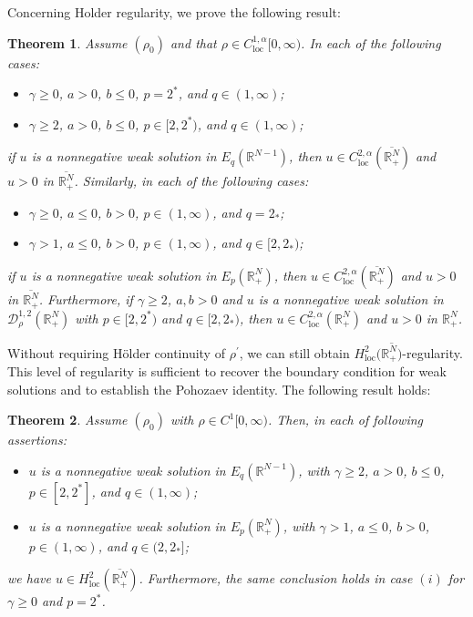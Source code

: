 \documentclass[12pt,reqno]{amsart}
\newtheorem{theorem}{Theorem}[section]
\begin{document}
\bigskip


Concerning Holder regularity, we prove the following result:

\begin{theorem}\label{Holder regularity result}
Assume $(\rho_0)$ and that $\rho\in C^{1,\alpha}_{\mathrm{loc}}[0,\infty)$. In each of the following cases:
\begin{itemize}
    \item[$(i)$] $\gamma \geq 0$, $a > 0$, $b \leq 0$, $p = 2^\ast$, and $q \in (1,\infty)$;
    \item[$(ii)$] $\gamma \geq 2$, $a > 0$, $b \leq 0$, $p \in [2, 2^\ast)$, and $q \in (1,\infty)$;
\end{itemize}
if $u$ is a nonnegative weak solution in $E_q(\mathds{R}^{N-1})$, then \( u \in C^{2,\alpha}_{\mathrm{loc}}(\overline{\mathds{R}^N_+}) \) and \( u > 0 \) in \( \overline{\mathds{R}^N_+} \). Similarly, in each of the following cases:
\begin{itemize}
    \item[$(iii)$] $\gamma \geq 0$, $a \leq 0$, $b > 0$, $p \in (1,\infty)$, and $q = 2_\ast$;
    \item[$(iv)$] $\gamma > 1$, $a \leq 0$, $b > 0$, $p \in (1,\infty)$, and $q \in [2, 2_\ast)$;
\end{itemize}
if $u$ is a nonnegative weak solution in $E_p(\mathds{R}^N_+)$, then \( u \in C^{2,\alpha}_{\mathrm{loc}}(\overline{\mathds{R}^N_+}) \) and $u>0$ in $ \overline{\mathds{R}^N_+} $. Furthermore, if $\gamma\geq 2$, $a,b>0$ and $u$ is a nonnegative weak solution in $\mathcal{D}^{1,2}_\rho(\mathds{R}^N_+)$ with $p\in[2,2^\ast)$ and $q\in[2,2_\ast)$, then $u \in C^{2,\alpha}_{\mathrm{loc}}(\mathds{R}^N_+)$ and $u>0$ in $\mathds{R}^N_+$.
\end{theorem}

Without requiring Hölder continuity of $\rho^\prime$, we can still obtain $H^2_{\mathrm{loc}}(\overline{\mathds{R}^N_+)}$-regularity. This level of regularity is sufficient to recover the boundary condition for weak solutions and to establish the Pohozaev identity. 
The following result holds:


\begin{theorem}\label{H2_loc regularity theorem} Assume $(\rho_0)$ with $\rho\in C^1[0,\infty)$. Then, in each of following assertions:
\begin{itemize}
    \item[$(i)$]  $u$ is a nonnegative weak solution in $E_q(\mathds{R}^{N-1})$, with $\gamma\geq 2$, $a > 0$, $b \leq 0$, $p \in [2,2^\ast]$, and $q \in (1,\infty)$;
    \item[$(ii)$]  $u$ is a nonnegative weak solution in $E_p(\mathds{R}^N_+)$, with $\gamma>1$, $a \leq 0$, $b > 0$, $p \in (1,\infty)$, and $q \in (2, 2_\ast]$;
\end{itemize}
we have $u\in H^2_{\mathrm{loc}}(\overline{\mathds{R}^N_+})$. Furthermore, the same conclusion holds in case $(i)$ for $\gamma \geq 0$ and $p = 2^*$.
\end{theorem}
\end{document}
